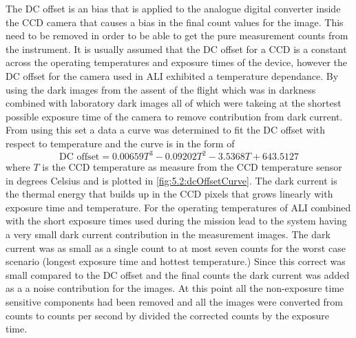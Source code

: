 The DC offset is an bias that is applied to the analogue digital converter inside the CCD camera that causes a bias in the final count values for the image. This need to be removed in order to be able to get the pure measurement counts from the instrument. It is usually assumed that the DC offset for a CCD is a constant across the operating temperatures and exposure times of the device, however the DC offset for the camera used in ALI exhibited a temperature dependance. By using the dark images from the assent of the flight which was in darkness combined with laboratory dark images all of which were takeing at the shortest possible exposure time of the camera to remove contribution from dark current. From using this set a data a curve was determined to fit the DC offset with respect to temperature and the curve is in the form of
\begin{equation}
    \text{DC offset} = 0.00659T^{3}-0.09202T^{2}-3.5368T+643.5127
    \label{eqn:5.2:DcOffsetCurve}
\end{equation}
where $T$ is the CCD temperature as measure from the CCD temperature sensor in degrees Celsius and is plotted in \autoref{fig:5.2:dcOffsetCurve}. The dark current is the thermal energy that builds up in the CCD pixels that grows linearly with exposure time and temperature. For the operating temperatures of ALI combined with the short exposure times used during the mission lead to the system having a very small dark current contribution in the measurement images. The dark current was as small as a single count to at most seven counts for the worst case scenario (longest exposure time and hottest temperature.) Since this correct was small compared to the DC offset and the final counts the dark current was added as a a noise contribution for the images. At this point all the non-exposure time sensitive components had been removed and all the images were converted from counts to counts per second by divided the corrected counts by the exposure time.

